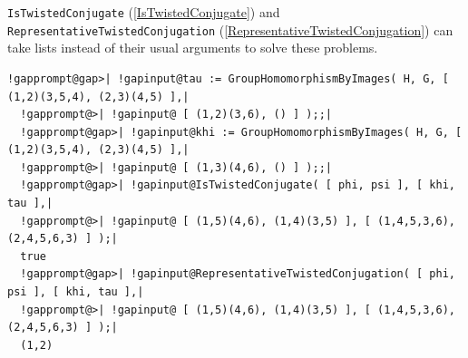 \documentclass[a4paper,11pt]{report}
\begin{document}
{{ 

 

 \texttt{IsTwistedConjugate} (\ref{IsTwistedConjugate}) and \texttt{RepresentativeTwistedConjugation} (\ref{RepresentativeTwistedConjugation}) can take lists instead of their usual arguments to solve these problems. 
\begin{Verbatim}[commandchars=!@|,fontsize=\small,frame=single,label=Example]
  !gapprompt@gap>| !gapinput@tau := GroupHomomorphismByImages( H, G, [ (1,2)(3,5,4), (2,3)(4,5) ],|
  !gapprompt@>| !gapinput@ [ (1,2)(3,6), () ] );;|
  !gapprompt@gap>| !gapinput@khi := GroupHomomorphismByImages( H, G, [ (1,2)(3,5,4), (2,3)(4,5) ],|
  !gapprompt@>| !gapinput@ [ (1,3)(4,6), () ] );;|
  !gapprompt@gap>| !gapinput@IsTwistedConjugate( [ phi, psi ], [ khi, tau ],|
  !gapprompt@>| !gapinput@ [ (1,5)(4,6), (1,4)(3,5) ], [ (1,4,5,3,6), (2,4,5,6,3) ] );|
  true
  !gapprompt@gap>| !gapinput@RepresentativeTwistedConjugation( [ phi, psi ], [ khi, tau ],|
  !gapprompt@>| !gapinput@ [ (1,5)(4,6), (1,4)(3,5) ], [ (1,4,5,3,6), (2,4,5,6,3) ] );|
  (1,2)
\end{Verbatim}
 }

 }

   
\end{document}
